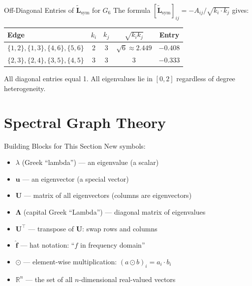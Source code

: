 \begin{examplebox}{Off-Diagonal Entries of $\tilde{\mathbf{L}}_{\mathrm{sym}}$ for $G_6$}
The formula $[\tilde{\mathbf{L}}_{\mathrm{sym}}]_{ij} = -A_{ij}/\sqrt{k_i \cdot k_j}$ gives:
\begin{center}
\begin{tabular}{lcccc}
\toprule
Edge & $k_i$ & $k_j$ & $\sqrt{k_i k_j}$ & Entry \\
\midrule
$\{1,2\},\{1,3\},\{4,6\},\{5,6\}$ & 2 & 3 & $\sqrt{6}\approx 2.449$ & $-0.408$ \\
$\{2,3\},\{2,4\},\{3,5\},\{4,5\}$ & 3 & 3 & $3$ & $-0.333$ \\
\bottomrule
\end{tabular}
\end{center}
All diagonal entries equal 1. All eigenvalues lie in $[0, 2]$ regardless of degree heterogeneity.
\end{examplebox}

\section{Spectral Graph Theory}
\label{sec:spectral}

\begin{conceptbox}{Building Blocks for This Section}
New symbols:
\begin{itemize}[noitemsep]
    \item $\lambda$ (Greek ``lambda'') --- an eigenvalue (a scalar)
    \item $\mathbf{u}$ --- an eigenvector (a special vector)
    \item $\mathbf{U}$ --- matrix of all eigenvectors (columns are eigenvectors)
    \item $\boldsymbol{\Lambda}$ (capital Greek ``Lambda'') --- diagonal matrix of eigenvalues
    \item $\mathbf{U}^\top$ --- transpose of $\mathbf{U}$: swap rows and columns
    \item $\hat{\mathbf{f}}$ --- hat notation: ``$f$ in frequency domain''
    \item $\odot$ --- element-wise multiplication: $(a \odot b)_i = a_i \cdot b_i$
    \item $\mathbb{R}^n$ --- the set of all $n$-dimensional real-valued vectors
\end{itemize}
\end{conceptbox}

